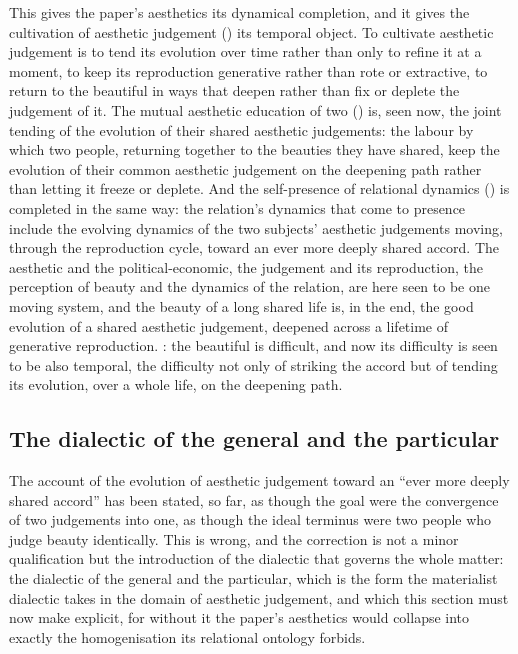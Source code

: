 This gives the paper's aesthetics its dynamical completion, and it gives the cultivation of aesthetic judgement () its temporal object. To cultivate aesthetic judgement is to tend its evolution over time rather than only to refine it at a moment, to keep its reproduction generative rather than rote or extractive, to return to the beautiful in ways that deepen rather than fix or deplete the judgement of it. The mutual aesthetic education of two () is, seen now, the joint tending of the evolution of their shared aesthetic judgements: the labour by which two people, returning together to the beauties they have shared, keep the evolution of their common aesthetic judgement on the deepening path rather than letting it freeze or deplete. And the self-presence of relational dynamics () is completed in the same way: the relation's dynamics that come to presence include the evolving dynamics of the two subjects' aesthetic judgements moving, through the reproduction cycle, toward an ever more deeply shared accord. The aesthetic and the political-economic, the judgement and its reproduction, the perception of beauty and the dynamics of the relation, are here seen to be one moving system, and the beauty of a long shared life is, in the end, the good evolution of a shared aesthetic judgement, deepened across a lifetime of generative reproduction. : the beautiful is difficult, and now its difficulty is seen to be also temporal, the difficulty not only of striking the accord but of tending its evolution, over a whole life, on the deepening path.

\subsection{The dialectic of the general and the particular}
\label{p21:sub:ev-dialectic}

The account of the evolution of aesthetic judgement toward an ``ever more deeply shared accord'' has been stated, so far, as though the goal were the convergence of two judgements into one, as though the ideal terminus were two people who judge beauty identically. This is wrong, and the correction is not a minor qualification but the introduction of the dialectic that governs the whole matter: the dialectic of the general and the particular, which is the form the materialist dialectic takes in the domain of aesthetic judgement, and which this section must now make explicit, for without it the paper's aesthetics would collapse into exactly the homogenisation its relational ontology forbids.

